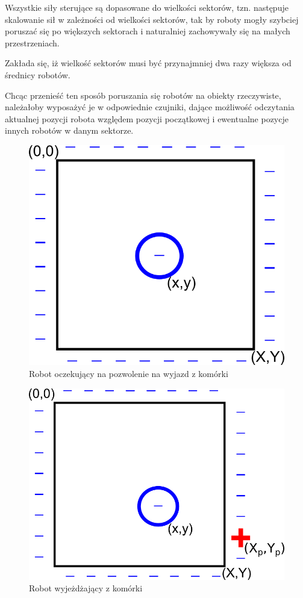 	Wszystkie siły sterujące są dopasowane do wielkości sektorów, tzn. następuje skalowanie sił w zależności od wielkości sektorów, tak by roboty mogły szybciej poruszać się po większych sektorach i naturalniej zachowywały się na małych przestrzeniach.
	
	Zakłada się, iż wielkość sektorów musi być przynajmniej dwa razy większa od średnicy robotów.
	
	Chcąc przenieść ten sposób poruszania się robotów na obiekty rzeczywiste, należałoby wyposażyć je w odpowiednie czujniki, dające możliwość odczytania aktualnej pozycji robota względem pozycji początkowej i ewentualne pozycje innych robotów w danym sektorze.
	
	
	\begin{figure}[H]
		\centering
		\includegraphics[scale=0.9]{img/waiting.png}
		\caption{Robot oczekujący na pozwolenie na wyjazd z komórki}
		\label{pic:waiting}
	\end{figure}
	\begin{figure}[H]
		\centering
		\includegraphics[scale=0.9]{img/moving.png}
		\caption{Robot wyjeżdżający z komórki}
		\label{pic:moving}
	\end{figure}
